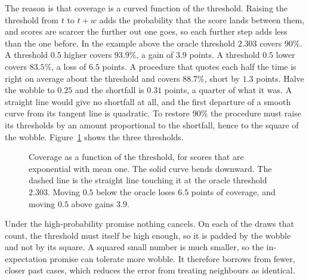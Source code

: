 \documentclass[11pt]{article}
\theoremstyle{definition}
\theoremstyle{remark}
\begin{document}
The reason is that coverage is a curved function of the threshold. Raising the threshold
from $t$ to $t+w$ adds the probability that the score lands between them, and scores are
scarcer the further out one goes, so each further step adds less than the one before. In
the example above the oracle threshold $2.303$ covers $90\%$. A threshold $0.5$ higher
covers $93.9\%$, a gain of $3.9$ points. A threshold $0.5$ lower covers $83.5\%$, a loss of
$6.5$ points. A procedure that quotes each half the time is right on average about the
threshold and covers $88.7\%$, short by $1.3$ points. Halve the wobble to $0.25$ and the
shortfall is $0.31$ points, a quarter of what it was. A straight line would give no
shortfall at all, and the first departure of a smooth curve from its tangent line is
quadratic. To restore $90\%$ the procedure must raise its thresholds by an amount
proportional to the shortfall, hence to the square of the wobble.
Figure~\ref{fig:curve} shows the three thresholds.

\begin{figure}[h]
\centering
{}
\caption{Coverage as a function of the threshold, for scores that are exponential with mean
one. The solid curve bends downward. The dashed line is the straight line touching it at the
oracle threshold $2.303$. Moving $0.5$ below the oracle loses $6.5$ points of coverage, and
moving $0.5$ above gains $3.9$.}
\label{fig:curve}
\end{figure}

Under the high-probability promise nothing cancels. On each of the draws that count, the
threshold must itself be high enough, so it is padded by the wobble and not by its square. A
squared small number is much smaller, so the in-expectation promise can tolerate more
wobble. It therefore borrows from fewer, closer past cases, which reduces the error from
treating neighbours as identical.
\end{document}
